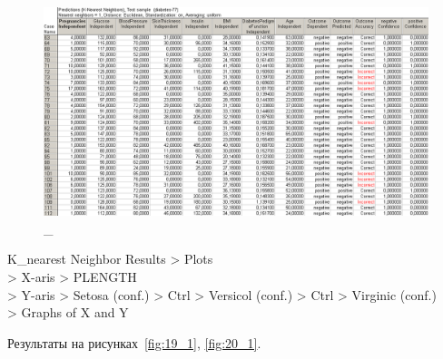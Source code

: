 \begin{figure}[!hp]
  \centering

  \includegraphics[width=18cm]
  {inc/v5_21.PNG}

  \caption{\_}

  \label{fig:18}
\end{figure}

\newpage

K\_nearest Neighbor Results > Plots \\
> X-aris > PLENGTH \\
> Y-aris > Setosa (conf.) > Ctrl > Versicol (conf.) > Ctrl > Virginic (conf.) \\
> Graphs of X and Y

Результаты на рисунках~\ref{fig:19_1}, \ref{fig:20_1}.

